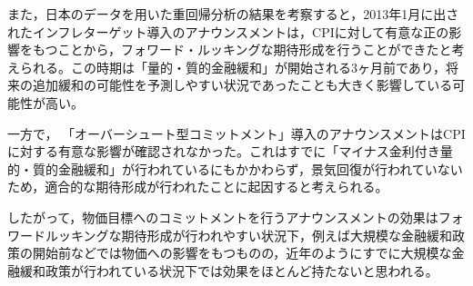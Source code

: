 \documentclass[12pt]{jarticle}
\begin{document}
{また，日本のデータを用いた重回帰分析の結果を考察すると，2013年1月に出されたインフレターゲット導入のアナウンスメントは，CPIに対して有意な正の影響をもつことから，フォワード・ルッキングな期待形成を行うことができたと考えられる。この時期は「量的・質的金融緩和」が開始される3ヶ月前であり，将来の追加緩和の可能性を予測しやすい状況であったことも大きく影響している可能性が高い。

一方で， 「オーバーシュート型コミットメント」導入のアナウンスメントはCPIに対する有意な影響が確認されなかった。これはすでに「マイナス金利付き量的・質的金融緩和」が行われているにもかかわらず，景気回復が行われていないため，適合的な期待形成が行われたことに起因すると考えられる。

したがって，物価目標へのコミットメントを行うアナウンスメントの効果はフォワードルッキングな期待形成が行われやすい状況下，例えば大規模な金融緩和政策の開始前などでは物価への影響をもつものの，近年のようにすでに大規模な金融緩和政策が行われている状況下では効果をほとんど持たないと思われる。




}
\end{document}
